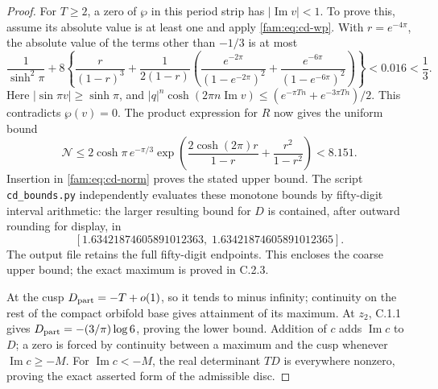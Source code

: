 \begin{proof}
For \(T\geq2\), a zero of \(\wp\) in this period strip has
\(|\operatorname{Im}v|<1\). To prove this, assume its absolute value is at
least one and apply \eqref{fam:eq:cd-wp}. With \(r=e^{-4\pi}\), the absolute
value of the terms other than \(-1/3\) is at most
\[
 \frac1{\sinh^2\pi}+8\left\{
 \frac r{(1-r)^3}+\frac1{2(1-r)}
 \left(\frac{e^{-2\pi}}{(1-e^{-2\pi})^2}
 +\frac{e^{-6\pi}}{(1-e^{-6\pi})^2}\right)\right\}<0.016<\frac13.
\]
Here \(|\sin\pi v|\geq\sinh\pi\), and
\(|q|^n\cosh(2\pi n\operatorname{Im}v)\leq
(e^{-\pi Tn}+e^{-3\pi Tn})/2\). This contradicts \(\wp(v)=0\).
The product expression for \(R\) now gives the uniform bound
\[
 \mathcal N\leq2\cosh\pi\,e^{-\pi/3}
 \exp\left(\frac{2\cosh(2\pi)r}{1-r}+\frac{r^2}{1-r^2}\right)
 <8.151.
\]
Insertion in \eqref{fam:eq:cd-norm} proves the stated upper bound. The script
\texttt{cd\_bounds.py} independently evaluates these monotone bounds by
fifty-digit interval arithmetic: the larger resulting bound for \(D\) is
contained, after outward rounding for display, in
\[
 [1.63421874605891012363,\;1.63421874605891012365].
\]
The output file retains the full fifty-digit endpoints.
This encloses the coarse upper bound; the exact maximum is proved in C.2.3.

At the cusp \(D_{\rm part}=-T+o(1)\), so it tends to minus infinity;
continuity on the rest of the compact orbifold base gives attainment of
its maximum. At \(z_2\), C.1.1 gives
\(D_{\rm part}=-(3/\pi)\log6\), proving the lower bound. Addition of \(c\)
adds \(\operatorname{Im}c\) to \(D\); a zero is forced by continuity
between a maximum and the cusp whenever \(\operatorname{Im}c\geq-M\).
For \(\operatorname{Im}c<-M\), the real determinant \(TD\) is everywhere
nonzero, proving the exact asserted form of the admissible disc.
\end{proof}

